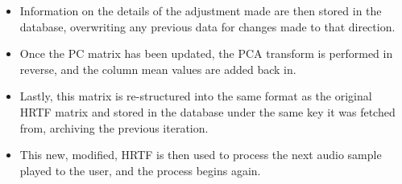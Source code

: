 \begin{itemize}
\begin{itemize}
\end{itemize}
\item Information on the details of the adjustment made are then stored in the database, overwriting any previous data for changes made to that direction.
\item Once the PC matrix has been updated, the PCA transform is performed in reverse, and the column mean values are added back in.
\item Lastly, this matrix is re-structured into the same format as the original HRTF matrix and stored in the database under the same key it was fetched from, archiving the previous iteration. 
\item This new, modified, HRTF is then used to process the next audio sample played to the user, and the process begins again. 
\end{itemize}
